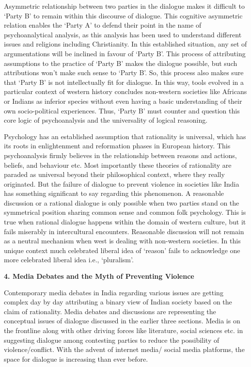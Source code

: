 \begin{multicols}{2}
\noi
Asymmetric relationship between two parties in the dialogue makes it difficult to ‘Party B’ to
remain within this discourse of dialogue. This cognitive asymmetric relation enables the ‘Party
A’ to defend their point in the name of psychoanalytical analysis, as this analysis has been used
to understand different issues and religions including Christianity. In this established situation,
any set of argumentations will be inclined in favour of ‘Party B’. This process of attributing
assumptions to the practice of ‘Party B’ makes the dialogue possible, but such attributions won’t
make such sense to ‘Party B’. So, this process also makes sure that ‘Party B’ is not intellectually
fit for dialogue. In this way, tools evolved in a particular context of western history concludes
non-western societies like Africans or Indians as inferior species without even having a basic
understanding of their own socio-political experiences. Thus, ‘Party B’ must counter and question
this core logic of psychoanalysis and the universality of logical reasoning.

\noi
Psychology has an established assumption that rationality is universal, which has its roots in
enlightenment and reformation phases in European history. This psychoanalysis firmly believes
in the relationship between reasons and actions, beliefs, and behaviour etc. Most importantly these
theories of rationality are paraded as universal beyond their philosophical context, where they
really originated. But the failure of dialogue to prevent violence in societies like India has
something significant to say regarding this phenomenon. A reasonable discussion or a rational
dialogue is only possible when two parties stand on the symmetrical position sharing common
sense and common folk psychology. This is true when rational dialogue happens within the
domain of western culture, but it fails miserably in intercultural encounters. Reasonable
discussion will not remain as a neutral mechanism when west is dealing with non-western
societies. In this unique context much celebrated liberal idea of ‘reason’ fails to acknowledge one
more celebrated liberal idea i.e., ‘pluralism’.

\noi
{\large \bfseries 4. Media Debates and the Myth of Preventing Violence}

\noi
Contemporary media debates in India regarding various issues are getting complex day by day
attributing a binary view of Indian society based on the claim of rationality. Media debates and
discussions are representing the conceptual issues of dialogue discussed in the earlier three
sections. Media is on the frontline along with other driving forces like literature, social sciences
etc. in suggesting dialogue among contesting parties to reduce the possibility of violence/conflict. With the advent of internet media/ social media platforms, the space for dialogue is increasing
than ever before.


\end{multicols}
